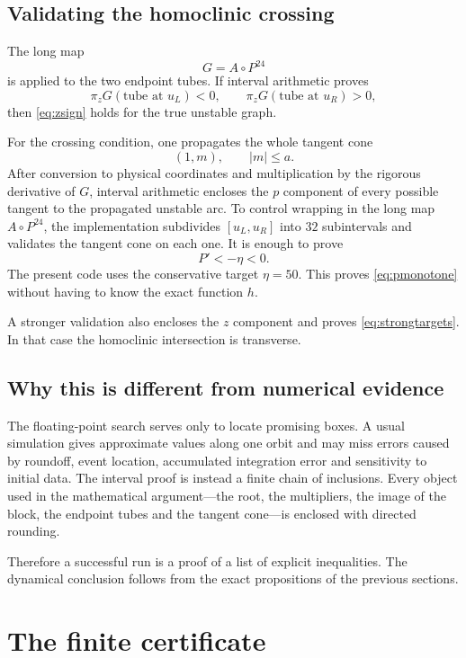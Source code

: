 \documentclass[11pt]{article}
\begin{document}
\subsection{Validating the homoclinic crossing}

The long map
\[
 G=A\circ P^{24}
\]
is applied to the two endpoint tubes.  If interval arithmetic proves
\[
 \pi_zG(\text{tube at }u_L)<0,
 \qquad
 \pi_zG(\text{tube at }u_R)>0,
\]
then \eqref{eq:zsign} holds for the true unstable graph.

For the crossing condition, one propagates the whole tangent cone
\[
 (1,m),\qquad |m|\le a.
\]
After conversion to physical coordinates and multiplication by the rigorous
derivative of $G$, interval arithmetic encloses the $p$ component of every
possible tangent to the propagated unstable arc.  To control wrapping in the
long map $A\circ P^{24}$, the implementation subdivides
$[u_L,u_R]$ into $32$ subintervals and validates the tangent cone on each one.
It is enough to prove
\[
 P'<-\eta<0.
\]
The present code uses the conservative target $\eta=50$.  This proves
\eqref{eq:pmonotone} without having to know the exact function $h$.

A stronger validation also encloses the $z$ component and proves
\eqref{eq:strongtargets}.  In that case the homoclinic intersection is
transverse.

\subsection{Why this is different from numerical evidence}

The floating-point search serves only to locate promising boxes.  A usual
simulation gives approximate values along one orbit and may miss errors
caused by roundoff, event location, accumulated integration error and
sensitivity to initial data.  The interval proof is instead a finite chain
of inclusions.  Every object used in the mathematical argument---the root,
the multipliers, the image of the block, the endpoint tubes and the tangent
cone---is enclosed with directed rounding.

Therefore a successful run is a proof of a list of explicit inequalities.
The dynamical conclusion follows from the exact propositions of the previous
sections.

\section{The finite certificate}\label{sec:certificate}
\end{document}
